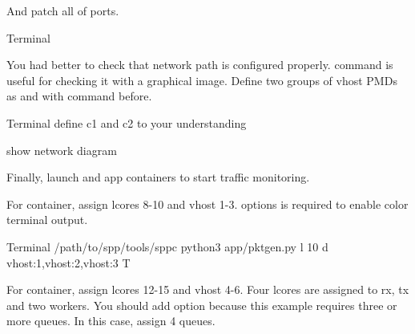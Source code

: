 \documentclass[a4paper,11pt,openany,oneside,english]{sphinxmanual}
\begin{document}
And patch all of ports.

\begin{sphinxVerbatim}[commandchars=\\\{\},formatcom=\footnotesize]
 Terminal 
\end{sphinxVerbatim}

You had better to check that network path is configured properly.
 command is useful for checking it with a graphical image.
Define two groups of vhost PMDs as  and  with
 command before.

\begin{sphinxVerbatim}[commandchars=\\\{\},formatcom=\footnotesize]
 Terminal 
 define c1 and c2 to  your understanding

 show network diagram
\end{sphinxVerbatim}

Finally, launch  and  app containers
to start traffic monitoring.

For  container, assign lcores 8-10 and vhost 1-3.
 options is required to enable color terminal output.

\begin{sphinxVerbatim}[commandchars=\\\{\},formatcom=\footnotesize]
 Terminal 
  /path/to/spp/tools/sppc
 python3 app/pktgen.py \PYGZhy{}l \PYGZhy{}10 \PYGZhy{}d vhost:1,vhost:2,vhost:3 \PYGZhy{}T
\end{sphinxVerbatim}

For  container, assign lcores 12-15 and vhost 4-6.
Four lcores are assigned to rx, tx and two workers.
You should add  option because this example requires three
or more queues. In this case, assign 4 queues.
\end{document}
